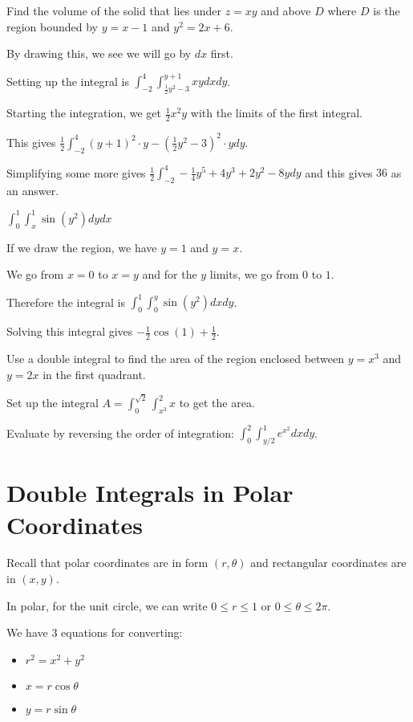 \documentclass[../calc3.tex]{subfiles}
\begin{document}
\begin{example}
    Find the volume of the solid that lies under $z=xy$ and above $D$ where $D$ is the region bounded by $y=x-1$ and $y^2=2x+6$.

    By drawing this, we see we will go by $dx$ first.

    Setting up the integral is $\int_{-2}^4 \int_{\frac{1}{2}y^2-3}^{y+1}xydx dy$.

    Starting the integration, we get $\frac{1}{2}x^2y$ with the limits of the first integral.

    This gives $\frac{1}{2}\int_{-2}^4 (y+1)^2\cdot y-\left(\frac{1}{2}y^2-3\right)^2\cdot y dy$.

    Simplifying some more gives $\frac{1}{2}\int_{-2}^4 -\frac{1}{4}y^5+4y^3+2y^2-8y dy$ and this gives $36$ as an answer.
\end{example}

\pagebreak
\begin{example}
    $\int_0^1 \int_x^1 \sin(y^2)dy dx$

    If we draw the region, we have $y=1$ and $y=x$.

    We go from $x=0$ to $x=y$ and for the $y$ limits, we go from $0$ to $1$.

    Therefore the integral is $\int_0^1 \int_0^y \sin(y^2)dxdy$.

    Solving this integral gives $-\frac{1}{2}\cos(1)+\frac{1}{2}$.
\end{example}

\begin{example}
    Use a double integral to find the area of the region enclosed between $y=x^3$ and $y=2x$ in the first quadrant.

    Set up the integral $A=\int_0^{\sqrt{2}}\int_{x^3}^2x$ to get the area.
\end{example}

\ex Evaluate by reversing the order of integration: $\int_0^2 \int_{y/2}^1 e^{x^2}dxdy$.

\section{Double Integrals in Polar Coordinates}
Recall that polar coordinates are in form $(r,\theta)$ and rectangular coordinates are in $(x,y)$.

In polar, for the unit circle, we can write $0\leq r\leq 1$ or $0\leq \theta \leq 2\pi$.

We have $3$ equations for converting: 
\begin{itemize}
    \item $r^2=x^2+y^2$
    \item $x=r\cos\theta$
    \item $y=r\sin\theta$
\end{itemize}
\end{document}
